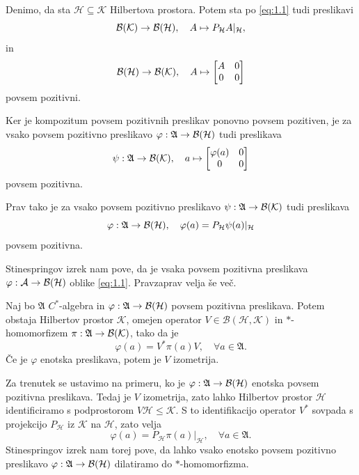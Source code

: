 \begin{zgled}
    Denimo, da sta $\mathcal{H} \subseteq \mathcal{K}$ Hilbertova prostora.
    Potem sta po \eqref{eq:1.1} tudi preslikavi
    $$
        \operatorname{\mathcal{B} (\mathcal{K})} \to \operatorname{\mathcal{B} (\mathcal{H})},
        \quad
        A \mapsto P_{\mathcal{H}}A|_{\mathcal{H}},
    $$
    in
    $$
        \operatorname{\mathcal{B} (\mathcal{H})} \to \operatorname{\mathcal{B} (\mathcal{K})},
        \quad
        A \mapsto
        \begin{bmatrix}
            A & 0\\
            0 & 0
        \end{bmatrix}
    $$
    povsem pozitivni. 
    
    Ker je kompozitum povsem pozitivnih preslikav
    ponovno povsem pozitiven, je za vsako povsem pozitivno preslikavo
    $\varphi : \mathfrak{A} \to \operatorname{\mathcal{B} (\mathcal{H})}$
    tudi preslikava
    $$
        \psi : \mathfrak{A} \to \operatorname{\mathcal{B} (\mathcal{K})},
        \quad
        a \mapsto
        \begin{bmatrix}
            \varphi(a) & 0\\
            0 & 0
        \end{bmatrix}
    $$
    povsem pozitivna.

    Prav tako je za vsako povsem pozitivno preslikavo
    $\psi : \mathfrak{A} \to \operatorname{\mathcal{B} (\mathcal{K})}$
    tudi preslikava
    $$
        \varphi : \mathfrak{A} \to \operatorname{\mathcal{B} (\mathcal{H})},
        \quad
        \varphi(a)=P_{\mathcal{H}}\psi(a)|_{\mathcal{H}}
    $$
    povsem pozitivna. 
\end{zgled}

Stinespringov izrek nam pove, da je 
vsaka povsem pozitivna preslikava 
$\varphi : \mathcal{A} \to \operatorname{\mathcal{B} (\mathcal{H})}$
oblike \eqref{eq:1.1}. 
Pravzaprav velja še več.

\begin{izrek}[Stinespring]\label{izr:1.1}
    Naj bo $\mathfrak{A}$ $C^*$-algebra in $\varphi: \mathfrak{A} \to \operatorname{\mathcal{B} (\mathcal{H})}$ povsem pozitivna preslikava.
    Potem obstaja Hilbertov prostor $\mathcal{K}$, omejen operator $V \in \mathcal{B} (\mathcal{H}, \mathcal{K})$
    in $*$-homomorfizem 
    $\pi: \mathfrak{A} \to \operatorname{\mathcal{B} (\mathcal{K})}$, tako da je
    $$\varphi(a) = V^* \pi(a) V,\quad \forall a \in \mathfrak{A}.$$
    Če je $\varphi$ enotska preslikava, potem je $V$ izometrija.
\end{izrek}


Za trenutek se ustavimo na primeru, ko je $\varphi: \mathfrak{A} \to \operatorname{\mathcal{B} (\mathcal{H})}$ enotska povsem pozitivna preslikava.
Tedaj je $V$ izometrija, zato lahko
Hilbertov prostor $\mathcal{H}$ identificiramo s podprostorom
$V\mathcal{H} \leq \mathcal{K}$.
S to identifikacijo operator $V^*$ sovpada s projekcijo
$P_{\mathcal{H}}$ iz $\mathcal{K}$ na $\mathcal{H}$, zato velja
$$
    \varphi(a)=P_{\mathcal{H}}\pi(a)|_{\mathcal{H}},\quad \forall a \in \mathfrak{A}.
$$
Stinespringov izrek nam torej pove, da lahko vsako enotsko povsem pozitivno preslikavo $\varphi: \mathfrak{A} \to \operatorname{\mathcal{B} (\mathcal{H})}$ dilatiramo do
$*$-homomorfizma.

